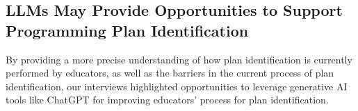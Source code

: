 \subsection{LLMs May Provide Opportunities to Support Programming Plan Identification}
\label{sec:opportunities}

By providing a more precise understanding of how plan identification is currently performed by educators, as well as the barriers in the current process of plan identification,
our interviews highlighted opportunities to leverage generative AI tools like ChatGPT for improving educators' process for plan identification. 
%
% 


